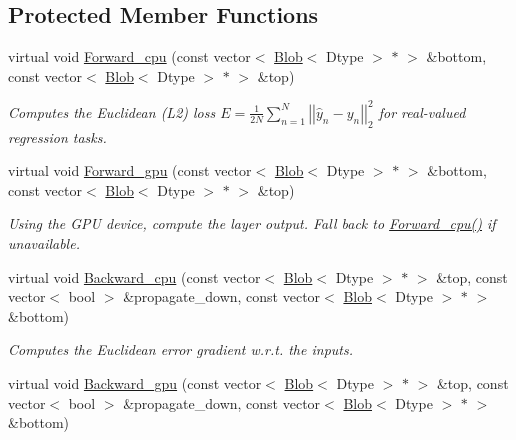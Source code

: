 \subsection*{Protected Member Functions}
\begin{DoxyCompactItemize}
\item 
virtual void \hyperlink{classcaffe_1_1EuclideanLossLayer_aa642f3d938b4e1d0c8b240c68ba8a856}{Forward\+\_\+cpu} (const vector$<$ \hyperlink{classcaffe_1_1Blob}{Blob}$<$ Dtype $>$ $\ast$ $>$ \&bottom, const vector$<$ \hyperlink{classcaffe_1_1Blob}{Blob}$<$ Dtype $>$ $\ast$ $>$ \&top)
\begin{DoxyCompactList}\small\item\em Computes the Euclidean (L2) loss $ E = \frac{1}{2N} \sum\limits_{n=1}^N \left| \left| \hat{y}_n - y_n \right| \right|_2^2 $ for real-\/valued regression tasks. \end{DoxyCompactList}\item 
virtual void \hyperlink{classcaffe_1_1EuclideanLossLayer_a0eddd3fca6ec788b61bc55960cbce68a}{Forward\+\_\+gpu} (const vector$<$ \hyperlink{classcaffe_1_1Blob}{Blob}$<$ Dtype $>$ $\ast$ $>$ \&bottom, const vector$<$ \hyperlink{classcaffe_1_1Blob}{Blob}$<$ Dtype $>$ $\ast$ $>$ \&top)\hypertarget{classcaffe_1_1EuclideanLossLayer_a0eddd3fca6ec788b61bc55960cbce68a}{}\label{classcaffe_1_1EuclideanLossLayer_a0eddd3fca6ec788b61bc55960cbce68a}

\begin{DoxyCompactList}\small\item\em Using the G\+PU device, compute the layer output. Fall back to \hyperlink{classcaffe_1_1EuclideanLossLayer_aa642f3d938b4e1d0c8b240c68ba8a856}{Forward\+\_\+cpu()} if unavailable. \end{DoxyCompactList}\item 
virtual void \hyperlink{classcaffe_1_1EuclideanLossLayer_afc83c3980206b9c24b5985819c13475c}{Backward\+\_\+cpu} (const vector$<$ \hyperlink{classcaffe_1_1Blob}{Blob}$<$ Dtype $>$ $\ast$ $>$ \&top, const vector$<$ bool $>$ \&propagate\+\_\+down, const vector$<$ \hyperlink{classcaffe_1_1Blob}{Blob}$<$ Dtype $>$ $\ast$ $>$ \&bottom)
\begin{DoxyCompactList}\small\item\em Computes the Euclidean error gradient w.\+r.\+t. the inputs. \end{DoxyCompactList}\item 
virtual void \hyperlink{classcaffe_1_1EuclideanLossLayer_a2a7972df719c3a49a7308e78927fc024}{Backward\+\_\+gpu} (const vector$<$ \hyperlink{classcaffe_1_1Blob}{Blob}$<$ Dtype $>$ $\ast$ $>$ \&top, const vector$<$ bool $>$ \&propagate\+\_\+down, const vector$<$ \hyperlink{classcaffe_1_1Blob}{Blob}$<$ Dtype $>$ $\ast$ $>$ \&bottom)\hypertarget{classcaffe_1_1EuclideanLossLayer_a2a7972df719c3a49a7308e78927fc024}{}\label{classcaffe_1_1EuclideanLossLayer_a2a7972df719c3a49a7308e78927fc024}


\end{DoxyCompactItemize}
